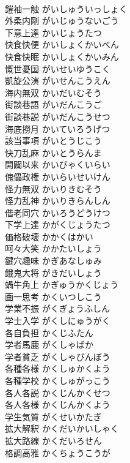 \documentclass[8pt]{extreport}
\begin{document}
\begin{CJK}{UTF8}{min}
\\	鎧袖一触	がいしゅういっしょく	
\\	外柔内剛	がいじゅうないごう	
\\	下意上達	かいじょうたつ	
\\	快食快便	かいしょくかいべん	
\\	快食快眠	かいしょくかいみん	
\\	慨世憂国	がいせいゆうこく	
\\	凱旋公演	がいせんこうえん	
\\	海内無双	かいだいむそう	
\\	街談巷語	がいだんこうご	
\\	街談巷説	がいだんこうせつ	
\\	海底撈月	かいていろうげつ	
\\	該当事項	がいとうじこう	
\\	快刀乱麻	かいとうらんま	
\\	開闢以来	かいびゃくいらい	
\\	傀儡政権	かいらいせいけん	
\\	怪力無双	かいりきむそう	
\\	怪力乱神	かいりきらんしん	
\\	偕老同穴	かいろうどうけつ	
\\	下学上達	かがくじょうたつ	
\\	価格破壊	かかくはかい	
\\	呵々大笑	かかたいしょう	
\\	鍵穴趣味	かぎあなしゅみ	
\\	餓鬼大将	がきだいしょう	
\\	蝸牛角上	かぎゅうかくじょう	
\\	画一思考	かくいつしこう	
\\	学業不振	がくぎょうふしん	
\\	学士入学	がくしにゅうがく	
\\	各自負担	かくじふたん	
\\	学者馬鹿	がくしゃばか	
\\	学者貧乏	がくしゃびんぼう	
\\	各種各様	かくしゅかくよう	
\\	各種学校	かくしゅがっこう	
\\	各人各説	かくじんかくせつ	
\\	各人各様	かくじんかくよう	
\\	学生気質	がくせいかたぎ	
\\	拡大解釈	かくだいかいしゃく	
\\	拡大路線	かくだいろせん	
\\	格調高雅	かくちょうこうが	

\end{CJK}
\end{document}

